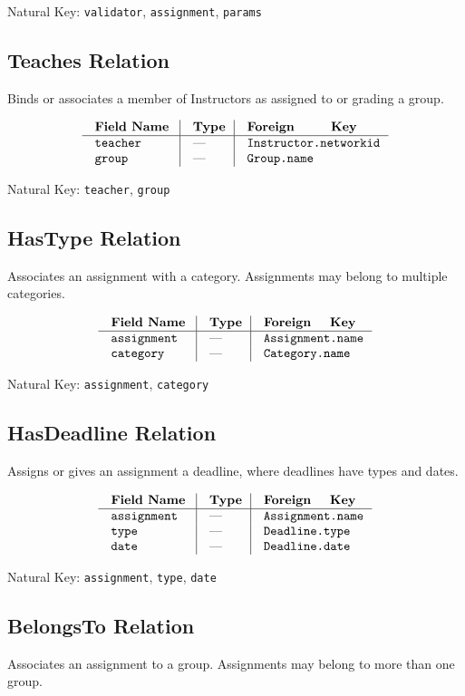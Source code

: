 {\noindent
Natural Key: {\tt validator}, {\tt assignment}, {\tt params}\par}

\subsection{Teaches Relation}
Binds or associates a member of Instructors as assigned to or grading a group.

$$\vbox{
  \offinterlineskip
  \halign{
    \strut \quad {\tt #}  & \vrule\quad #  & \vrule\quad # \cr
    {\bf Field Name}  & {\bf Type}  & {\bf Foreign Key}\cr
    \noalign{\hrule}    
    teacher  & ---  & {\tt Instructor.networkid} \cr
    group  & ---  & {\tt Group.name} \cr
  }
}$$

{\noindent
Natural Key: {\tt teacher}, {\tt group}\par}

\subsection{HasType Relation}
Associates an assignment with a category. 
Assignments may belong to multiple categories.

$$\vbox{
  \offinterlineskip
  \halign{
    \strut \quad {\tt #}  & \vrule\quad #  & \vrule\quad # \cr
    {\bf Field Name}  & {\bf Type}  & {\bf Foreign Key}\cr
    \noalign{\hrule}    
    assignment  & ---  & {\tt Assignment.name} \cr
    category  & ---  & {\tt Category.name} \cr
  }
}$$

{\noindent
Natural Key: {\tt assignment}, {\tt category}\par}

\subsection{HasDeadline Relation}
Assigns or gives an assignment a deadline,
where deadlines have types and dates.

$$\vbox{
  \offinterlineskip
  \halign{
    \strut \quad {\tt #}  & \vrule\quad #  & \vrule\quad # \cr
    {\bf Field Name}  & {\bf Type}  & {\bf Foreign Key}\cr
    \noalign{\hrule}    
    assignment  & ---  & {\tt Assignment.name} \cr
    type & --- & {\tt Deadline.type} \cr
    date & --- & {\tt Deadline.date} \cr
  }
}$$

{\noindent
Natural Key: {\tt assignment}, {\tt type}, {\tt date}\par}

\subsection{BelongsTo Relation}
Associates an assignment to a group.
Assignments may belong to more than one group.

